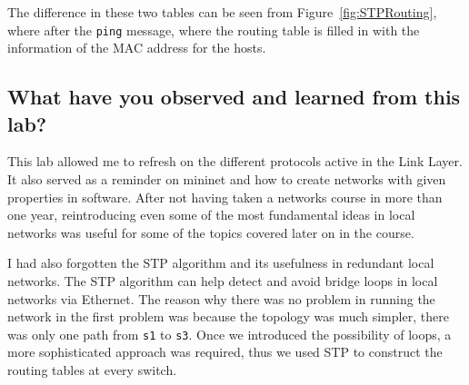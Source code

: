 \documentclass{article}
\begin{document}
The difference in these two tables can be seen from Figure~\ref{fig:STPRouting}, 
where after the \texttt{ping} message, where the routing table is filled in with 
the information of the MAC address for the hosts.

\subsection{What have you observed and learned from this lab?}
This lab allowed me to refresh on the different protocols active in the Link Layer. 
It also served as a reminder on mininet and how to create networks with given properties
in software.
After not having taken a networks course in more than one year, reintroducing even some of the most
fundamental ideas in local networks was useful for some of the topics covered later on in the course.

I had also forgotten the STP algorithm and its usefulness in redundant local networks.
The STP algorithm can help detect and avoid bridge loops in local networks via Ethernet.
The reason why there was no problem in running the network in the first problem was because the 
topology was much simpler, there was only one path from \texttt{s1} to \texttt{s3}.
Once we introduced the possibility of loops, a more sophisticated approach was 
required, thus we used STP to construct the routing tables at every switch.
\end{document}
